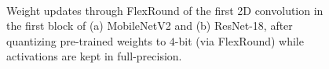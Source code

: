 \documentclass{article}
\theoremstyle{plain}
\theoremstyle{definition}
\theoremstyle{remark}
\begin{document}
\begin{figure}
    \vskip -0.05in
    \centering
    \\
    \vskip -0.01in
    \vskip -0.1in
    \caption{Weight updates through FlexRound of the first 2D convolution in the first block of (a) MobileNetV2 and (b) ResNet-18, after quantizing pre-trained weights to $4$-bit (via FlexRound) while activations are kept in full-precision.} 
    \label{fig:histogram}
    \vskip -0.05in
\end{figure}

\end{document}
